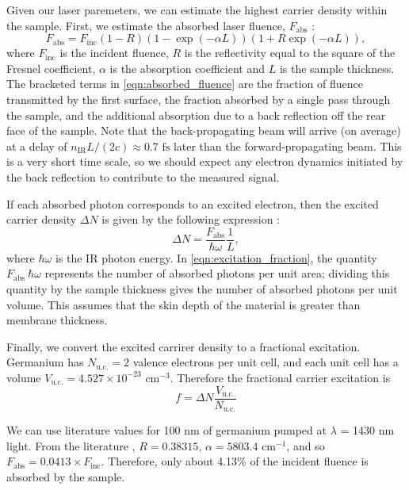 Given our laser paremeters, we can estimate the highest carrier density within the sample. First, we estimate the absorbed laser fluence, $F_{\text{abs}}$ \cite{harbCarrierRelaxationLattice2006}:
\begin{equation}
F_{\text{abs}} = F_{\text{inc}} \left(1-R\right) \left( 1-\exp(-\alpha L) \right) \left(1+R \exp(-\alpha L)\right),
\label{eqn:absorbed_fluence}
\end{equation}
where $F_{\text{inc}}$ is the incident fluence, $R$ is the reflectivity equal to the square of the Fresnel coefficient, $\alpha$ is the absorption coefficient and $L$ is the sample thickness. The bracketed terms in \cref{eqn:absorbed_fluence} are the fraction of fluence transmitted by the first surface, the fraction absorbed by a single pass through the sample, and the additional absorption due to a back reflection off the rear face of the sample. Note that the back-propagating beam will arrive (on average) at a delay of $n_{\text{IR}} L/(2c) \approx 0.7 \text{ fs}$ later than the forward-propagating beam. This is a very short time scale, so we should expect any electron dynamics initiated by the back reflection to contribute to the measured signal.

If each absorbed photon corresponds to an excited electron, then the excited carrier density $\Delta N$ is given by the following expression \cite{cushingDifferentiatingPhotoexcitedCarrier2019}:
\begin{equation}
\Delta N = \frac{F_{\text{abs}}}{\hbar \omega} \frac{1}{L},
\label{eqn:excitation_fraction}
\end{equation}
where $\hbar \omega$ is the IR photon energy. In \cref{eqn:excitation_fraction}, the quantity $F_{\text{abs}} \ \hbar \omega$ represents the number of absorbed photons per unit area; dividing this quantity by the sample thickness gives the number of absorbed photons per unit volume. This assumes that the skin depth of the material is greater than membrane thickness.

Finally, we convert the excited carrirer density to a fractional excitation. Germanium has $N_{\text{u.c.}}=2$ valence electrons per unit cell, and each unit cell has a volume $V_{\text{u.c.}}=4.527 \times 10^{-23} \text{ cm}^{-3}$. Therefore the fractional carrier excitation is
\begin{equation}
f = \Delta N \frac{V_{\text{u.c.}}}{N_{\text{u.c.}}}
\end{equation}

We can use literature values for 100 nm of germanium pumped at $\lambda$ = 1430 nm light. From the literature \cite{nunleyOpticalConstantsGermanium2016}, $R = 0.38315$, $\alpha = 5803.4 \text{ cm}^{-1}$, and so $F_{\text{abs}} = 0.0413 \times F_{\text{inc}}$. Therefore, only about 4.13\% of the incident fluence is absorbed by the sample.


